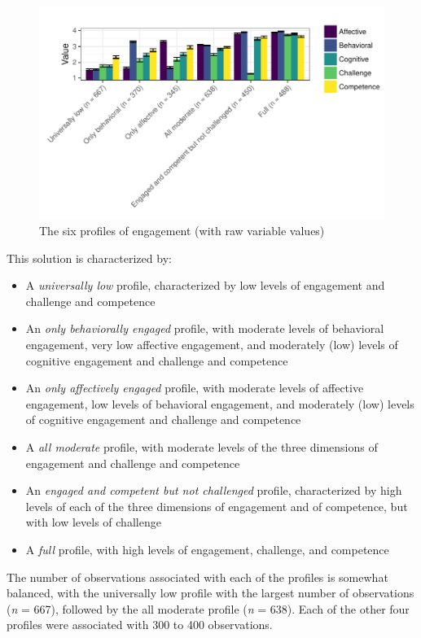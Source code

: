\documentclass[]{book}
\providecommand{\tightlist}{%
  \setlength{\itemsep}{0pt}\setlength{\parskip}{0pt}}
\theoremstyle{definition}
\theoremstyle{definition}
\theoremstyle{definition}
\theoremstyle{remark}
\begin{document}
\begin{figure}

{\centering \includegraphics[width=0.8\linewidth]{rosenberg-dissertation_files/figure-latex/unnamed-chunk-11-1} 

}

\caption{The six profiles of engagement (with raw variable values)}\label{fig:unnamed-chunk-11}
\end{figure}

This solution is characterized by:

\begin{itemize}
\tightlist
\item
  A \emph{universally low} profile, characterized by low levels of
  engagement and challenge and competence
\item
  An \emph{only behaviorally engaged} profile, with moderate levels of
  behavioral engagement, very low affective engagement, and moderately
  (low) levels of cognitive engagement and challenge and competence
\item
  An \emph{only affectively engaged} profile, with moderate levels of
  affective engagement, low levels of behavioral engagement, and
  moderately (low) levels of cognitive engagement and challenge and
  competence
\item
  A \emph{all moderate} profile, with moderate levels of the three
  dimensions of engagement and challenge and competence
\item
  An \emph{engaged and competent but not challenged} profile,
  characterized by high levels of each of the three dimensions of
  engagement and of competence, but with low levels of challenge
\item
  A \emph{full} profile, with high levels of engagement, challenge, and
  competence
\end{itemize}

The number of observations associated with each of the profiles is
somewhat balanced, with the universally low profile with the largest
number of observations (\emph{n} = 667), followed by the all moderate
profile (\emph{n} = 638). Each of the other four profiles were
associated with 300 to 400 observations.
\end{document}
